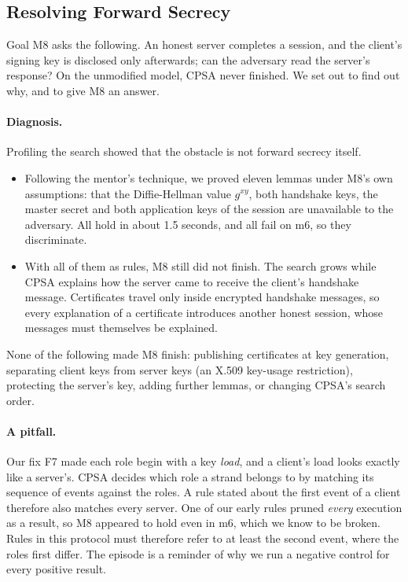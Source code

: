 \documentclass[11pt]{article}
\begin{document}
\subsection{Resolving Forward Secrecy}
\label{subsec:pfs}
Goal M8 asks the following. An honest server completes a session, and the client's signing key is disclosed only afterwards; can the adversary read the server's response? On the unmodified model, CPSA never finished. We set out to find out why, and to give M8 an answer.

\paragraph{Diagnosis.} Profiling the search showed that the obstacle is not forward secrecy itself.
\begin{itemize}
    \item Following the mentor's technique, we proved eleven lemmas under M8's own assumptions: that the Diffie-Hellman value $g^{xy}$, both handshake keys, the master secret and both application keys of the session are unavailable to the adversary. All hold in about 1.5 seconds, and all fail on m6, so they discriminate.
    \item With all of them as rules, M8 still did not finish. The search grows while CPSA explains how the server came to receive the client's handshake message. Certificates travel only inside encrypted handshake messages, so every explanation of a certificate introduces another honest session, whose messages must themselves be explained.
\end{itemize}
None of the following made M8 finish: publishing certificates at key generation, separating client keys from server keys (an X.509 key-usage restriction), protecting the server's key, adding further lemmas, or changing CPSA's search order.

\paragraph{A pitfall.} Our fix F7 made each role begin with a key \textit{load}, and a client's load looks exactly like a server's. CPSA decides which role a strand belongs to by matching its sequence of events against the roles. A rule stated about the first event of a client therefore also matches every server. One of our early rules pruned \textit{every} execution as a result, so M8 appeared to hold even in m6, which we know to be broken. Rules in this protocol must therefore refer to at least the second event, where the roles first differ. The episode is a reminder of why we run a negative control for every positive result.
\end{document}
